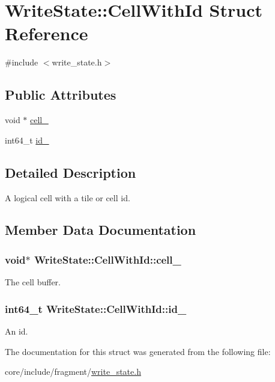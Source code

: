 \hypertarget{structWriteState_1_1CellWithId}{}\section{Write\+State\+:\+:Cell\+With\+Id Struct Reference}
\label{structWriteState_1_1CellWithId}


{\ttfamily \#include $<$write\+\_\+state.\+h$>$}

\subsection*{Public Attributes}
\begin{DoxyCompactItemize}
\item 
void $\ast$ \hyperlink{structWriteState_1_1CellWithId_af1e5becf1652803a338611443217dc4c}{cell\+\_\+}
\item 
int64\+\_\+t \hyperlink{structWriteState_1_1CellWithId_ac2790a2887c7f602b0b5851fccaf08c4}{id\+\_\+}
\end{DoxyCompactItemize}


\subsection{Detailed Description}
A logical cell with a tile or cell id. 

\subsection{Member Data Documentation}
\hypertarget{structWriteState_1_1CellWithId_af1e5becf1652803a338611443217dc4c}{}
\subsubsection[{cell\+\_\+}]{\setlength{\rightskip}{0pt plus 5cm}void$\ast$ Write\+State\+::\+Cell\+With\+Id\+::cell\+\_\+}\label{structWriteState_1_1CellWithId_af1e5becf1652803a338611443217dc4c}
The cell buffer. \hypertarget{structWriteState_1_1CellWithId_ac2790a2887c7f602b0b5851fccaf08c4}{}
\subsubsection[{id\+\_\+}]{\setlength{\rightskip}{0pt plus 5cm}int64\+\_\+t Write\+State\+::\+Cell\+With\+Id\+::id\+\_\+}\label{structWriteState_1_1CellWithId_ac2790a2887c7f602b0b5851fccaf08c4}
An id. 

The documentation for this struct was generated from the following file\+:\begin{DoxyCompactItemize}
\item 
core/include/fragment/\hyperlink{write__state_8h}{write\+\_\+state.\+h}\end{DoxyCompactItemize}
